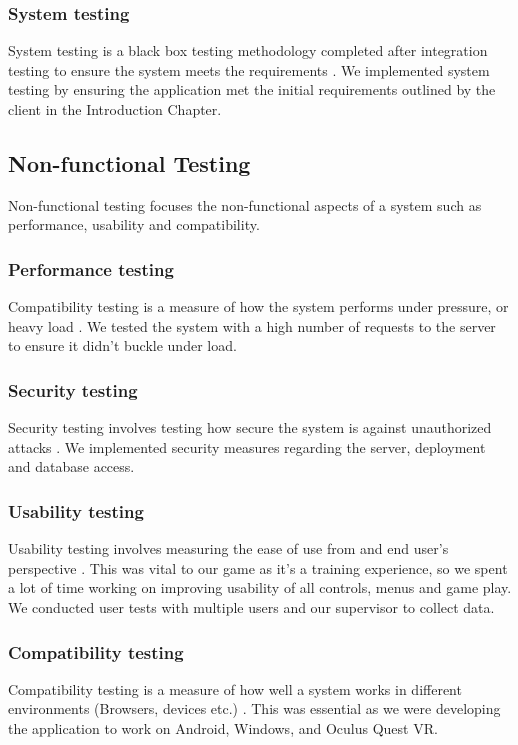 \subsubsection{System testing}
System testing is a black box testing methodology completed after integration testing to ensure the system meets the requirements \cite{1028373}. We implemented system testing by ensuring the application met the initial requirements outlined by the client in the Introduction Chapter.

\subsection{Non-functional Testing}
Non-functional testing focuses the non-functional aspects of a system such as performance, usability and compatibility.

\subsubsection{Performance testing}
Compatibility testing is a measure of how the system performs under pressure, or heavy load \cite{1028373}. We tested the system with a high number of requests to the server to ensure it didn't buckle under load.

\subsubsection{Security testing}
Security testing involves testing how secure the system is against unauthorized attacks \cite{1028373}. We implemented security measures regarding the server, deployment and database access.

\subsubsection{Usability testing}
Usability testing involves measuring the ease of use from and end user’s perspective \cite{5380492}. This was vital to our game as it's a training experience, so we spent a lot of time working on improving usability of all controls, menus and game play. We conducted user tests with multiple users and our supervisor to collect data.

\subsubsection{Compatibility testing}
Compatibility testing is a measure of how well a system works in different environments (Browsers, devices etc.) \cite{5380492}. This was essential as we were developing the application to work on Android, Windows, and Oculus Quest VR.

